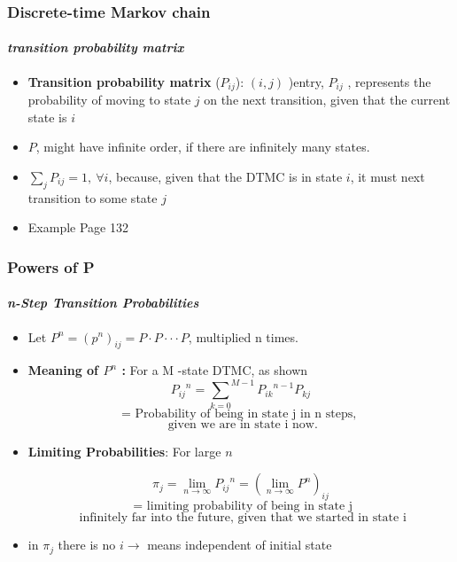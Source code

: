 \documentclass{beamer}
\begin{document}
\begin{frame}
\frametitle{Discrete-time Markov chain}
\framesubtitle{\textbf{\textit{ transition probability matrix}}}
\begin{itemize}
\item  \textbf{ Transition probability matrix} ($P_{ij}$): $(i,j)$ )entry, $P_{ij}$ , represents the probability of moving to state $j$ on the next transition, given that the current state is $i$


\item $P$, might have infinite order, if there are infinitely many states.

\item  $ \sum_j P_{ij} = 1, \: \forall i$, because, given
that the DTMC is in state $i$, it must next transition to some state $j$

\item Example Page 132

\end{itemize}
	
\end{frame}


\begin{frame}
\frametitle{Powers of P}
\framesubtitle{\textbf{\textit{ n-Step Transition Probabilities}}}
\begin{itemize}
\item  Let $P^n =  {(p^n)}_{ij} = P \cdot P \cdot \cdot \cdot P$, multiplied n times. 
\item \textbf{Meaning of $P^n$ : } For a M -state DTMC, as shown
$${{P}_{ij}}^n = {{\sum}_{k=0}}^{M-1} {{P}_{ik}}^{n-1} P_{kj}  $$
$$\text{=  Probability of being in state j in n steps, }$$
$$\text{  given we are in state i now.}$$

\item \textbf{Limiting Probabilities}: For large $n$

$$ \pi_{j}= {\lim}_{n \rightarrow \infty} {{P}_{ij}}^n = {({\lim}_{n \rightarrow \infty} {{P}}^n)}_{ij} $$
$$\text{ = limiting probability of being in state j}$$
$$\text{ infinitely far into the future, given that we started in state i}$$


\item in $\pi_{j}$ there is no $i \rightarrow $ means independent of initial state  
\end{itemize}
\end{frame}
\end{document}
